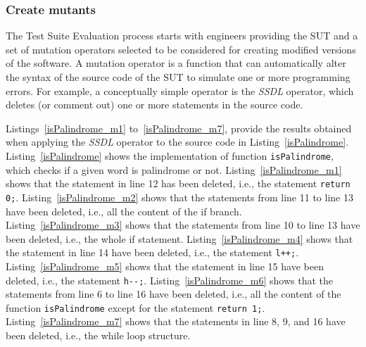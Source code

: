 \subsubsection{Create mutants}

The Test Suite Evaluation process starts with engineers providing the SUT and a set of mutation operators selected to be considered for creating modified versions of the software. 
A mutation operator is a function that can automatically alter the syntax of the source code of the SUT to simulate one or more programming errors.
For example, a conceptually simple operator is the \textit{SSDL} operator, which deletes (or comment out) one or more statements in the source code.



Listings~\ref{isPalindrome_m1} to~\ref{isPalindrome_m7}, provide the results obtained when applying the \textit{SSDL} operator to the source code in Listing~\ref{isPalindrome}.
Listing~\ref{isPalindrome} shows the implementation of function \texttt{isPalindrome}, which checks if a given word is palindrome or not.
Listing~\ref{isPalindrome_m1} shows that the statement in line 12 has been deleted, i.e., the statement \texttt{return 0;}.
Listing~\ref{isPalindrome_m2} shows that the statements from line 11 to line 13 have been deleted, i.e., all the content of the if branch.
Listing~\ref{isPalindrome_m3} shows that the statements from line 10 to line 13 have been deleted, i.e., the whole if statement.
Listing~\ref{isPalindrome_m4} shows that the statement in line 14 have been deleted, i.e., the statement \texttt{l++;}.
Listing~\ref{isPalindrome_m5} shows that the statement in line 15 have been deleted, i.e., the statement \texttt{h-}\texttt{-;}.
Listing~\ref{isPalindrome_m6} shows that the statements from line 6 to line 16 have been deleted, i.e., all the content of the function \texttt{isPalindrome} except for the statement \texttt{return 1;}.
Listing~\ref{isPalindrome_m7} shows that the statements in line 8, 9, and 16 have been deleted, i.e., the while loop structure.











